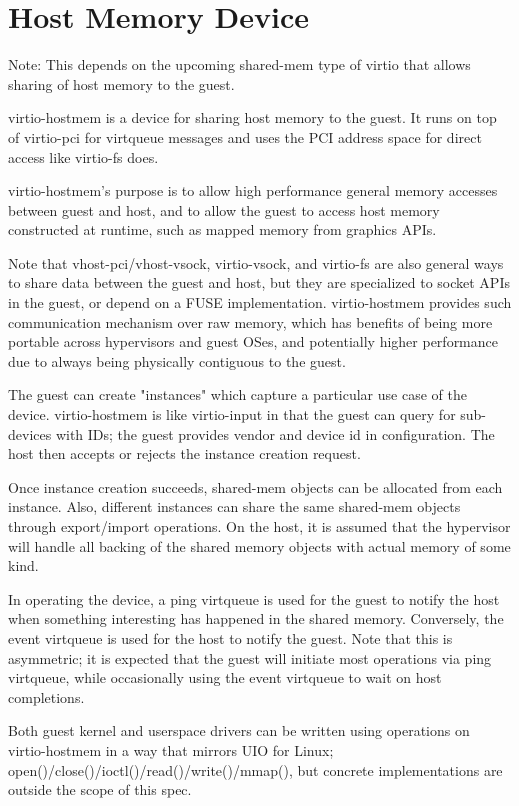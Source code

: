 \section{Host Memory Device}\label{sec:Device Types / Host Memory Device}

Note: This depends on the upcoming shared-mem type of virtio
that allows sharing of host memory to the guest.

virtio-hostmem is a device for sharing host memory to the guest.
It runs on top of virtio-pci for virtqueue messages and
uses the PCI address space for direct access like virtio-fs does.

virtio-hostmem's purpose is
to allow high performance general memory accesses between guest and host,
and to allow the guest to access host memory constructed at runtime,
such as mapped memory from graphics APIs.

Note that vhost-pci/vhost-vsock, virtio-vsock, and virtio-fs
are also general ways to share data between the guest and host,
but they are specialized to socket APIs in the guest,
or depend on a FUSE implementation.
virtio-hostmem provides such communication mechanism over raw memory,
which has benefits of being more portable across hypervisors and guest OSes,
and potentially higher performance due to always being physically contiguous to the guest.

The guest can create "instances" which capture
a particular use case of the device.
virtio-hostmem is like virtio-input in that the guest can query
for sub-devices with IDs;
the guest provides vendor and device id in configuration.
The host then accepts or rejects the instance creation request.

Once instance creation succeeds,
shared-mem objects can be allocated from each instance.
Also, different instances can share the same shared-mem objects
through export/import operations.
On the host, it is assumed that the hypervisor will handle
all backing of the shared memory objects with actual memory of some kind.

In operating the device, a ping virtqueue is used for the guest to notify the host
when something interesting has happened in the shared memory.
Conversely, the event virtqueue is used for the host to notify the guest.
Note that this is asymmetric;
it is expected that the guest will initiate most operations via ping virtqueue,
while occasionally using the event virtqueue to wait on host completions.

Both guest kernel and userspace drivers can be written using operations
on virtio-hostmem in a way that mirrors UIO for Linux;
open()/close()/ioctl()/read()/write()/mmap(),
but concrete implementations are outside the scope of this spec.


